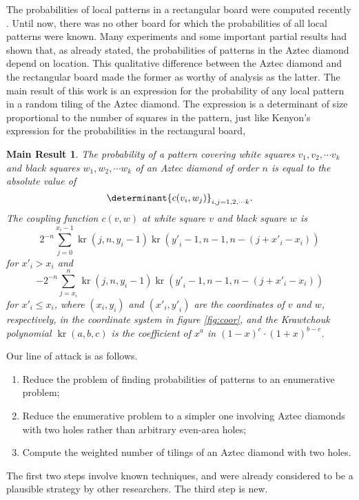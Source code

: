 \documentclass[10pt,reqno]{amsart}
\theoremstyle{plain}
\newtheorem{Mres}{Main Result}
\theoremstyle{definition}
\theoremstyle{remark}
\DeclareMathOperator{\kr }{kr}
\begin{document}
    The probabilities of local patterns in a rectangular board were computed
    recently \cite{Ken}. Until now, there was no other board for which
    the probabilities of all local patterns were known. Many experiments 
    and some important partial results \cite{CEP} had shown that, as already
    stated, the probabilities of patterns in the Aztec diamond depend on location.
    This qualitative difference between the Aztec diamond and the rectangular
    board made the former as worthy of analysis as the latter. 
    The main result of this work
    is an expression for the 
    probability of any local pattern in a random tiling of the Aztec diamond.
    The expression is a determinant of size proportional to the number of
    squares in the pattern, just like Kenyon's expression \cite{Ken} for
    the probabilities in the rectangural board,
     
    \begin{Mres}
    The probability of a pattern covering white squares $v_1,v_2,\dotsb v_k$
    and black squares $w_1,w_2,\dotsb w_k$ of
     an Aztec diamond of order $n$ is equal
    to the absolute value of
    \[\determinant{c(v_i,w_j)}_{i,j=1,2,\dotsb k}.\]
    The {\em coupling function} $c(v,w)$ at white square $v$ and black
    square $w$ is 
    \[2^{-n} \sum_{j=0}^{x_i-1} \kr(j,n,y_i-1) 
                    \kr({y\prime }_i - 1,n-1,n-(j+{x\prime }_i-x_i))
    \]
    for ${x\prime }_i > x_i$ and
    \[-2^{-n} \sum_{j=x_i}^n \kr(j,n,y_i-1) 
                 \kr({y\prime }_i-1,n-1,n-(j+{x\prime }_i-x_i))
    \]
    for ${x\prime }_i \leq x_i$, where $(x_i,y_i)$ and $({x\prime}_i,{y\prime}_i)$
    are the coordinates of $v$ and $w$, respectively, in the coordinate
    system in figure \ref{fig:coor}, and the {\em Krawtchouk polynomial}
    $\kr(a,b,c)$ is the coefficient of $x^a$ in $(1-x)^c\cdot (1+x)^{b-c}$.
    \end{Mres}

    Our line of attack is as follows.
\begin{enumerate}
\item Reduce the problem of finding probabilities of patterns to an 
enumerative problem;
\item Reduce the enumerative problem to a simpler one involving
Aztec diamonds with two holes rather than arbitrary even-area holes;
\item Compute the weighted number of tilings of an Aztec diamond with two holes.
\end{enumerate}

The first two steps involve known techniques, and were already considered
to be a plausible strategy by other researchers. The third step is new.
\end{document}
